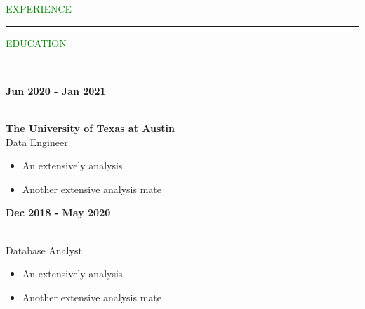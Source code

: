 \documentclass [
        11pt
] {article}
\begin{document}

\noindent\textcolor{green}{EXPERIENCE \rule{15.8cm}{1pt}}


\noindent\textcolor{green}{EDUCATION \rule{16cm}{1pt}}

\begin {vwcol} [
        widths={0.2,0.8},
        sep=.8cm,
        justify=flush,rule=0pt
]

\noindent \\\textbf {Jun 2020 - Jan 2021}\\

\pagebreak

\noindent \\ \textbf {The University of Texas at Austin}\\
\noindent Data Engineer

\begin{itemize}[noitemsep,topsep=-8pt]
 \renewcommand{\labelitemi}{\scriptsize$\blacksquare$}
 \item An extensively analysis
 \item Another extensive analysis mate
\end{itemize}

\end{vwcol}

\begin {vwcol} [
        widths={0.2,0.8},
        sep=.8cm,
        justify=flush,rule=0pt
]

\noindent \textbf {Dec 2018 - May 2020}\\

\pagebreak

\noindent \\ Database Analyst

\begin{itemize}[noitemsep,topsep=-8pt]
 \renewcommand{\labelitemi}{\scriptsize$\blacksquare$}
 \item An extensively analysis
 \item Another extensive analysis mate
\end{itemize}

\end{vwcol}
\end{document}
